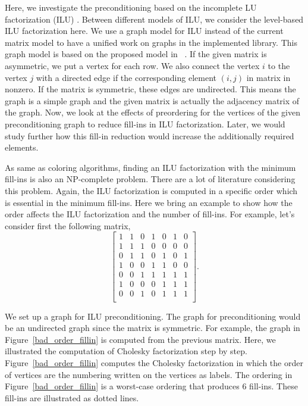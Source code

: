 \documentclass[11pt, twoside,a4paper]{book}
\begin{document}
Here, we investigate the preconditioning based on the incomplete LU factorization (ILU) \cite{ilu2003}.
Between different models of ILU, we consider the level-based ILU factorization here.
We use a graph model for ILU instead of the current matrix model to have a unified
work on graphs in the implemented library. This graph model is based on the proposed
model in ~\cite{precond-pothen}. If the given matrix is asymmetric,
we put a vertex for each row. We also connect the vertex $i$ to the
vertex $j$ with a directed edge if the corresponding element $(i,j)$ in matrix
in nonzero. If the matrix is symmetric, these edges are undirected. This means
the graph is a simple graph and the given matrix is actually the adjacency
matrix of the graph.
Now, we look at the effects of preordering for the vertices of the given preconditioning graph to reduce fill-ins in ILU factorization. Later, we would study further how this fill-in reduction would increase the additionally required elements.

As same as coloring algorithms, finding an ILU factorization with the minimum
fill-ins is also an NP-complete problem. There are a lot of literature
considering this problem\cite{ilu_ordering1,ilu_ordering2,ilu_ordering3,ilu_ordering4}.
Again, the ILU factorization is computed in a specific order which is essential
in the minimum fill-ins. Here we bring an example to show how the order affects
the ILU factorization and the number of fill-ins.
For example, let's consider first the following matrix,
$$\begin{bmatrix}
1 & 1 & 0 & 1 & 0 & 1 & 0\\
1 & 1 & 1 & 0 & 0 & 0 & 0\\
0 & 1 & 1 & 0 & 1 & 0 & 1\\
1 & 0 & 0 & 1 & 1 & 0 & 0\\
0 & 0 & 1 & 1 & 1 & 1 & 1\\
1 & 0 & 0 & 0 & 1 & 1 & 1\\
0 & 0 & 1 & 0 & 1 & 1 & 1\\
\end{bmatrix}.$$

We set up a graph for ILU preconditioning.
The graph for preconditioning would be an undirected graph
since the matrix is symmetric.
For example, the graph in Figure~\ref{bad_order_fillin}
is computed from the previous matrix. Here, we illustrated the
computation of Cholesky factorization step by step.
Figure~\ref{bad_order_fillin} computes the Cholesky factorization
in which the order of vertices are the numbering written on the vertices
as labels. The ordering in Figure~\ref{bad_order_fillin} is a worst-case ordering that produces $6$ fill-ins. These fill-ins are illustrated as dotted lines.
\end{document}
